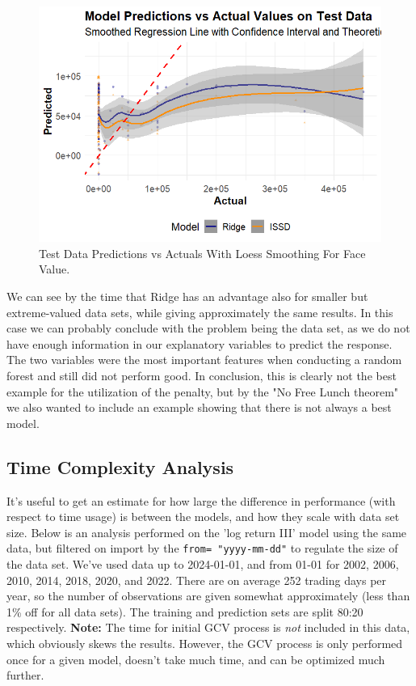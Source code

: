 \documentclass[12pt, twoside,hidelinks]{article}
\theoremstyle{definition}
\numberwithin{equation}{section}
\begin{document}
\begin{figure}[H]
\includegraphics[width=\textwidth]{visuals/ridge/FaceValueRidgeplot.png}
\caption{Test Data Predictions vs Actuals With Loess Smoothing For Face Value.}
\label{loess_Face_ridge}
\end{figure}

We can see by the time that Ridge has an advantage also for smaller but extreme-valued data sets, while giving approximately the same results. In this case we can probably conclude with the problem being the data set, as we do not have enough information in our explanatory variables to predict the response. The two variables were the most important features when conducting a random forest and still did not perform good. In conclusion, this is clearly not the best example for the utilization of the penalty, but by the "No Free Lunch theorem" we also wanted to include an example showing that there is not always a best model.

\subsection{Time Complexity Analysis}

It's useful to get an estimate for how large the difference in performance (with respect to time usage) is between the models, and how they scale with data set size. Below is an analysis performed on the 'log return III' model using the same data, but filtered on import by the \texttt{from= "yyyy-mm-dd"} to regulate the size of the data set. We've used data up to 2024-01-01, and from 01-01 for 2002, 2006, 2010, 2014, 2018, 2020, and 2022. There are on average 252 trading days per year, so the number of observations are given somewhat approximately (less than 1\% off for all data sets). The training and prediction sets are split 80:20 respectively. 
\textbf{Note:} The time for initial GCV process is \textit{not} included in this data, which obviously skews the results. However, the GCV process is only performed once for a given model, doesn't take much time, and can be optimized much further.
\end{document}
